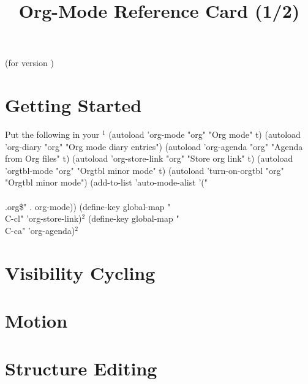 \def\threecol#1#2#3{\hskip\keyindent\relax#1\hfil&\kbd{#2}\hfil\quad
  &\kbd{#3}\hfil\quad\cr}



\title{Org-Mode Reference Card (1/2)}

\centerline{(for version \orgversionnumber)}

\section{Getting Started}
%
Put the following in your $^1$
\vskip -1mm
\beginexample%
(autoload 'org-mode "org" "Org mode" t)
(autoload 'org-diary "org" "Org mode diary entries")
(autoload 'org-agenda "org" "Agenda from Org files" t)
(autoload 'org-store-link "org" "Store org link" t)
(autoload 'orgtbl-mode "org" "Orgtbl minor mode" t)
(autoload 'turn-on-orgtbl "org" "Orgtbl minor mode")
(add-to-list 'auto-mode-alist '("\\\\.org\$" . org-mode))
(define-key global-map "\\C-cl" 'org-store-link)$^2$
(define-key global-map "\\C-ca" 'org-agenda)$^2$
\endexample
%

\section{Visibility Cycling}


\section{Motion}


\section{Structure Editing}

